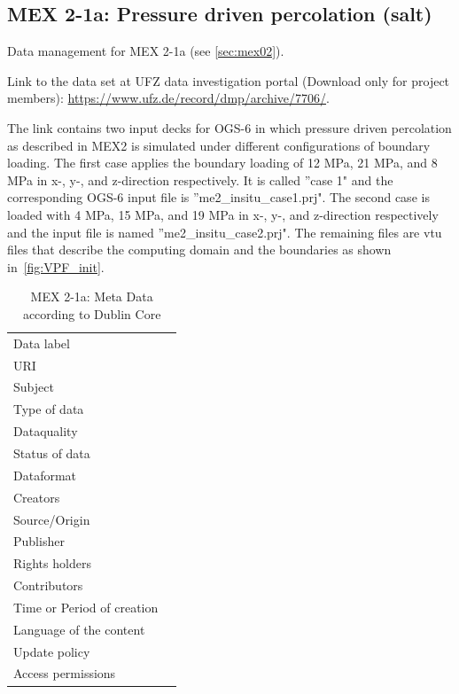 \subsection{MEX 2-1a: Pressure driven percolation (salt)}

Data management for MEX 2-1a (see \ref{sec:mex02}).

Link to the data set at UFZ data investigation portal (Download only for project members):
\hyperlink{https://www.ufz.de/record/dmp/archive/7706/}{https://www.ufz.de/record/dmp/archive/7706/}.

The link contains two input decks for OGS-6 in which pressure driven percolation as described in MEX2 is simulated under different configurations of boundary loading.
The first case applies the boundary loading of 12 MPa, 21 MPa, and 8 MPa in x-, y-, and z-direction respectively. It is called ''case 1" and the corresponding OGS-6 input file is ''me2\_insitu\_case1.prj".
The second case is loaded with 4 MPa, 15 MPa, and 19 MPa in x-, y-, and z-direction respectively and the input file is named ''me2\_insitu\_case2.prj".
The remaining files are vtu files that describe the computing domain and the boundaries as shown in~\ref{fig:VPF_init}.

\begin{table}[h!]
\caption{MEX 2-1a: Meta Data according to Dublin Core}
\label{tab:}
\small
\begin{tabular}{R{3cm}|L{7cm}}
\hline
%
Data label &  \\
URI &  \\
Subject  &  \\
Type of data  &  \\
Dataquality  &  \\
Status of data  &  \\
Dataformat  & \\
Creators  &  \\
Source/Origin &  \\
Publisher  &  \\
Rights holders &  \\
Contributors &  \\
Time or Period of creation &  \\
Language of the content &  \\
Update policy &  \\
Access permissions &  \\
%
\hline
\end{tabular}
\end{table}

